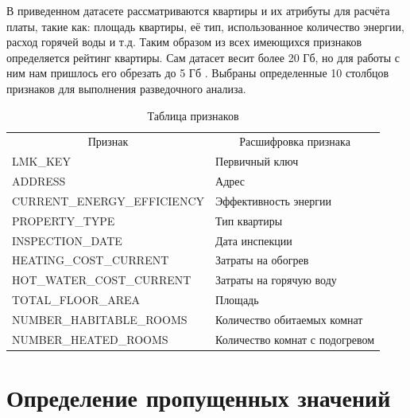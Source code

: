 В приведенном датасете рассматриваются квартиры и их атрибуты для расчёта платы, такие как: площадь квартиры, её тип, использованное количество энергии, расход горячей воды и т.д. Таким образом из всех имеющихся признаков определяется рейтинг квартиры. Сам датасет весит более 20 Гб, но для работы с ним нам пришлось его обрезать до 5 Гб \cite{https://www.kaggle.com/datasets/tyagia1/epcratingsenglandjuly203}. Выбраны определенные 10 столбцов признаков для выполнения разведочного анализа.

\begin{table}[]
    \centering
    \begin{tabularx}{\textwidth}{|X|X|}
        \hline
        \multicolumn{1}{|c|}{Признак}  & \multicolumn{1}{c|}{Расшифровка признака}   \\ \hhline{|=|=|}
        LMK\_KEY					& Первичный ключ      \\ \hline
        ADDRESS					& Адрес                       \\ \hline
        CURRENT\_ENERGY\_EFFICIENCY	&  Эффективность энергии      \\ \hline
        PROPERTY\_TYPE                             	& Тип квартиры                       \\ \hline
        INSPECTION\_DATE                          	& Дата инспекции      \\ \hline
        HEATING\_COST\_CURRENT             	& Затраты на обогрев                       \\ \hline
        HOT\_WATER\_COST\_CURRENT	& Затраты на горячую воду      \\ \hline
        TOTAL\_FLOOR\_AREA                       	& Площадь                       \\ \hline
        NUMBER\_HABITABLE\_ROOMS       	& Количество обитаемых комнат     \\ \hline
        NUMBER\_HEATED\_ROOMS          	& Количество комнат с подогревом                       \\ \hline
    \end{tabularx}
    \caption{Таблица признаков}
    \label{tab:features}
\end{table}

\vspace{\baselineskip}\section{Определение пропущенных значений}\vspace{\baselineskip}

